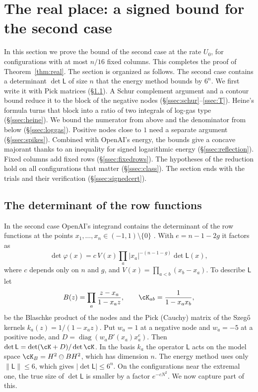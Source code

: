 \section{The real place: a signed bound for the second case}\label{sec:signed}

In this section we prove the bound of the second case at the rate $U_0$, for configurations with at most
$n/16$ fixed columns. This completes the proof of Theorem~\ref{thm:real}. The section is organized as
follows. The second case contains a determinant $\det\mathsf L$ of size $n$ that the energy method bounds by
$6^n$. We first write it with Pick matrices (\S\ref{ssec:pick}). A Schur complement argument and a contour
bound reduce it to the block of the negative nodes (\S\ref{ssec:schur}--\ref{ssec:T}). Heine's formula turns
that block into a ratio of two integrals of log-gas type (\S\ref{ssec:heine}). We bound the numerator from
above and the denominator from below (\S\ref{ssec:loggas}). Positive nodes close to $1$ need a separate
argument (\S\ref{ssec:spikes}). Combined with OpenAI's energy, the bounds give a concave majorant thanks to an
inequality for signed logarithmic energy (\S\ref{ssec:reflection}). Fixed columns add fixed rows
(\S\ref{ssec:fixedrows}). The hypotheses of the reduction hold on all configurations that matter
(\S\ref{ssec:class}). The section ends with the trials and their verification (\S\ref{ssec:signedcert}).

\subsection{The determinant of the row functions}\label{ssec:pick}
In the second case OpenAI's integrand contains the determinant of the row functions at the points
$x_1,\ldots,x_n\in(-1,1)\setminus\{0\}$ \cite[Prop.~5.3]{OpenAI2026}. With $e=n-1-2g$ it factors as
\begin{equation}\label{eq:detphi}
 \det\varphi(x)=c\,V(x)\prod_a|x_a|^{-(n-1-g)}\det\mathsf L(x),
\end{equation}
where $c$ depends only on $n$ and $g$, and $V(x)=\prod_{a<b}(x_b-x_a)$. To describe $\mathsf L$ let
\[
 B(z)=\prod_a\frac{z-x_a}{1-x_az},\qquad \cK_{ab}=\frac1{1-x_ax_b},
\]
be the Blaschke product of the nodes and the Pick (Cauchy) matrix of the Szeg\H{o} kernels $k_a(z)=1/(1-x_az)$.
Put $w_a=1$ at a negative node and $w_a=-5$ at a positive node, and $D=\operatorname{diag}(w_aB'(x_a)x_a^e)$.
Then $\det\mathsf L=\det(\cK+D)/\det\cK$. In the basis $k_a$ the operator $\mathsf L$ acts on the model space
$\cK_B=H^2\ominus BH^2$, which has dimension $n$. The energy method uses only $\|\mathsf L\|\le6$, which gives
$|\det\mathsf L|\le6^n$. On the configurations near the extremal one, the true size of $\det\mathsf L$ is
smaller by a factor $e^{-cN^2}$. We now capture part of this.

